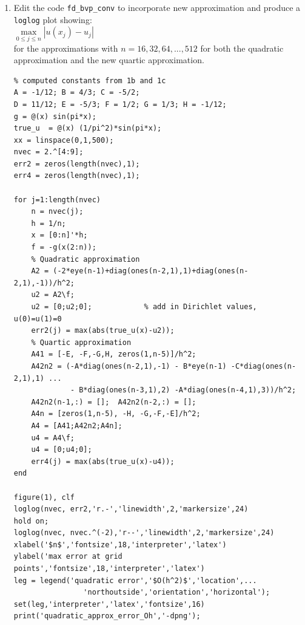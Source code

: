 \documentclass[14pt,a4paper]{article}
\begin{document}
\begin{enumerate}
	\label{1f}
	\item Edit the code \texttt{fd\_bvp\_conv} to incorporate new approximation and produce a \texttt{loglog} plot showing:\\
	\hspace*{5cm} $ \max\limits_{0 \leq j \leq n}|u(x_j) - u_j|$ \\
	for the approximations with $n = 16, 32, 64, ..., 512$ for both the quadratic approximation and the new quartic approximation.\\
	\begin{lstlisting}
% computed constants from 1b and 1c
A = -1/12; B = 4/3; C = -5/2;
D = 11/12; E = -5/3; F = 1/2; G = 1/3; H = -1/12;
g = @(x) sin(pi*x);
true_u  = @(x) (1/pi^2)*sin(pi*x);
xx = linspace(0,1,500);
nvec = 2.^[4:9];
err2 = zeros(length(nvec),1);
err4 = zeros(length(nvec),1);

for j=1:length(nvec)
	n = nvec(j);
	h = 1/n;
	x = [0:n]'*h;
	f = -g(x(2:n));
	% Quadratic approximation
	A2 = (-2*eye(n-1)+diag(ones(n-2,1),1)+diag(ones(n-2,1),-1))/h^2;
	u2 = A2\f;
	u2 = [0;u2;0];            % add in Dirichlet values, u(0)=u(1)=0
	err2(j) = max(abs(true_u(x)-u2));
	% Quartic approximation
	A41 = [-E, -F,-G,H, zeros(1,n-5)]/h^2;
	A42n2 = (-A*diag(ones(n-2,1),-1) - B*eye(n-1) -C*diag(ones(n-2,1),1) ...
			 - B*diag(ones(n-3,1),2) -A*diag(ones(n-4,1),3))/h^2;
	A42n2(n-1,:) = []; 	A42n2(n-2,:) = [];
	A4n = [zeros(1,n-5), -H, -G,-F,-E]/h^2;
	A4 = [A41;A42n2;A4n];
	u4 = A4\f;
	u4 = [0;u4;0];
	err4(j) = max(abs(true_u(x)-u4));
end

figure(1), clf
loglog(nvec, err2,'r.-','linewidth',2,'markersize',24)
hold on;
loglog(nvec, nvec.^(-2),'r--','linewidth',2,'markersize',24)
xlabel('$n$','fontsize',18,'interpreter','latex')
ylabel('max error at grid points','fontsize',18,'interpreter','latex')
leg = legend('quadratic error','$O(h^2)$','location',...
				'northoutside','orientation','horizontal');
set(leg,'interpreter','latex','fontsize',16)
print('quadratic_approx_error_Oh','-dpng');


\end{lstlisting}
\end{enumerate}
\end{document}
